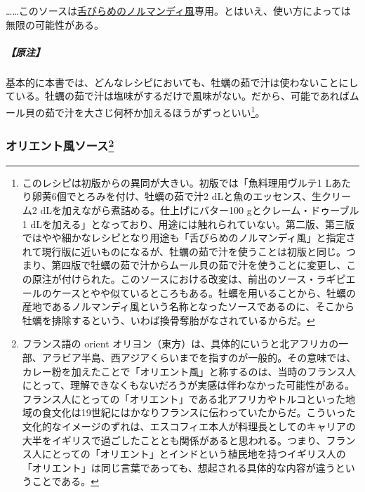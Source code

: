 \begin{recette}
\ldots{}\ldots{}このソースは\protect\hyperlink{sole-normande}{舌びらめのノルマンディ風}専用。とはいえ、使い方によっては無限の可能性がある。

\hypertarget{nota-sauce-normande}{%
\subparagraph{【原注】}\label{nota-sauce-normande}}

基本的に本書では、どんなレシピにおいても、牡蠣の茹で汁は使わないことにしている。牡蠣の茹で汁は塩味がするだけで風味がない。だから、可能であればムール貝の茹で汁を大さじ何杯か加えるほうがずっといい\footnote{このレシピは初版からの異同が大きい。初版では「魚料理用ヴルテ1
  Lあたり卵黄6個でとろみを付け、牡蠣の茹で汁2
  dLと魚のエッセンス、生クリーム2
  dLを加えながら煮詰める。仕上げにバター100 gとクレーム・ドゥーブル1
  dLを加える」となっており、用途には触れられていない。第二版、第三版ではやや細かなレシピとなり用途も「舌びらめのノルマンディ風」と指定されて現行版に近いものになるが、牡蠣の茹で汁を使うことは初版と同じ。つまり、第四版で牡蠣の茹で汁からムール貝の茹で汁を使うことに変更し、この原注が付けられた。このソースにおける改変は、前出のソース・ラギピエールのケースとやや似ているところもある。牡蠣を用いることから、牡蠣の産地であるノルマンディ風という名称となったソースであるのに、そこから牡蠣を排除するという、いわば換骨奪胎がなされているからだ。}。

\hypertarget{sauce-orientale}{%
\subsubsection[オリエント風ソース]{\texorpdfstring{オリエント風ソース\footnote{フランス語の
  orient
  オリヨン（東方）は、具体的にいうと北アフリカの一部、アラビア半島、西アジアくらいまでを指すのが一般的。その意味では、カレー粉を加えたことで「オリエント風」と称するのは、当時のフランス人にとって、理解できなくもないだろうが実感は伴わなかった可能性がある。フランス人にとっての「オリエント」である北アフリカやトルコといった地域の食文化は19世紀にはかなりフランスに伝わっていたからだ。こういった文化的なイメージのずれは、エスコフィエ本人が料理長としてのキャリアの大半をイギリスで過ごしたこととも関係があると思われる。つまり、フランス人にとっての「オリエント」とインドという植民地を持つイギリス人の「オリエント」は同じ言葉であっても、想起される具体的な内容が違うということである。}}{オリエント風ソース}}\label{sauce-orientale}}




\end{recette}
